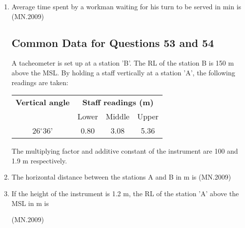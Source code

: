 \documentclass[journal]{IEEEtran}
\numberwithin{equation}{enumi}
\numberwithin{figure}{enumi}
\begin{document}
\begin{enumerate}
\item Average time spent by a workman waiting for his turn to be served in min is  \hfill{(MN.2009)}
\begin{enumerate}[label=(\Alph*)]
\end{enumerate}

\subsection*{Common Data for Questions 53 and 54}

A tacheometer is set up at a station 'B'. The RL of the station B is 150 m above the MSL. By holding a staff vertically at a station 'A', the following readings are taken:

\begin{center}
\begin{tabular}{|c|c|c|c|}
\hline
\textbf{Vertical angle} & \multicolumn{3}{c|}{\textbf{Staff readings (m)}} \\
\cline{2-4}
 & Lower & Middle & Upper \\
\hline
26$^\circ$36' & 0.80 & 3.08 & 5.36 \\
\hline
\end{tabular}
\end{center}

The multiplying factor and additive constant of the instrument are 100 and 1.9 m respectively.

\item The horizontal distance between the stations A and B in m is
\hfill{(MN.2009)}
\begin{enumerate}[label=(\Alph*)]
\end{enumerate}

\item If the height of the instrument is 1.2 m, the RL of the station 'A' above the MSL in m is%

\hfill{(MN.2009)}
\begin{enumerate}[label=(\Alph*)]
\end{enumerate}

\end{enumerate}
\end{document}

